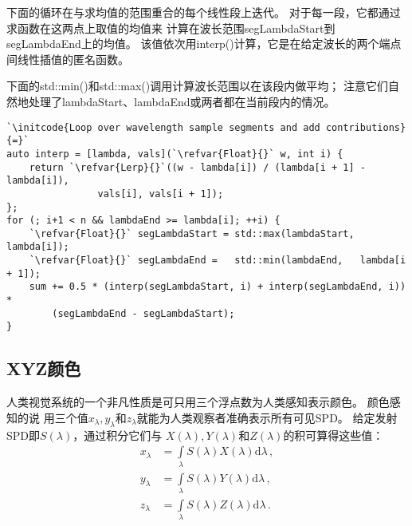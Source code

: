 下面的循环在与求均值的范围重合的每个线性段上迭代。
对于每一段，它都通过求函数在这两点上取值的均值来
计算在波长范围{\ttfamily segLambdaStart}到{\ttfamily segLambdaEnd}上的均值。
该值依次用{\ttfamily interp()}计算，它是在给定波长的两个端点间线性插值的匿名函数。

下面的{\ttfamily std::min()}和{\ttfamily std::max()}调用计算波长范围以在该段内做平均；
注意它们自然地处理了{\ttfamily lambdaStart}、{\ttfamily lambdaEnd}或两者都在当前段内的情况。
\begin{lstlisting}
`\initcode{Loop over wavelength sample segments and add contributions}{=}`
auto interp = [lambda, vals](`\refvar{Float}{}` w, int i) {
    return `\refvar{Lerp}{}`((w - lambda[i]) / (lambda[i + 1] - lambda[i]),
                vals[i], vals[i + 1]);
};
for (; i+1 < n && lambdaEnd >= lambda[i]; ++i) {
    `\refvar{Float}{}` segLambdaStart = std::max(lambdaStart, lambda[i]);
    `\refvar{Float}{}` segLambdaEnd =   std::min(lambdaEnd,   lambda[i + 1]);
    sum += 0.5 * (interp(segLambdaStart, i) + interp(segLambdaEnd, i)) *
        (segLambdaEnd - segLambdaStart);
}
\end{lstlisting}

\subsection{XYZ颜色}\label{sub:XYZ颜色}
人类视觉系统的一个非凡性质是可只用三个浮点数为人类感知表示颜色。
颜色感知的说
用三个值$x_{\lambda},y_{\lambda}$和$z_{\lambda}$就能为人类观察者准确表示所有可见SPD。
给定发射SPD即$S(\lambda)$，通过积分它们与
$X(\lambda),Y(\lambda)$和$Z(\lambda)$的积可算得这些值：
\begin{align}
    x_{\lambda} & =\int\limits_{\lambda}{S(\lambda)X(\lambda)\mathrm{d}\lambda}\, ,\nonumber \\
    y_{\lambda} & =\int\limits_{\lambda}{S(\lambda)Y(\lambda)\mathrm{d}\lambda}\, ,          \\
    z_{\lambda} & =\int\limits_{\lambda}{S(\lambda)Z(\lambda)\mathrm{d}\lambda}\, .\nonumber
\end{align}
